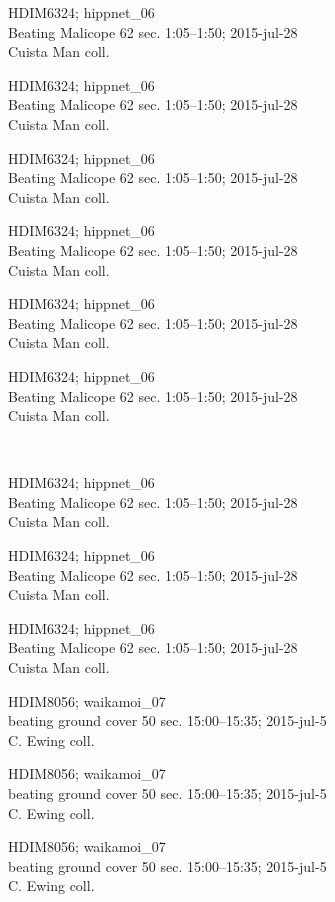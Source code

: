 \documentclass[2pt]{extarticle}
\begin{document}
\noindent
\parbox{0.16\textwidth}{\tiny \raggedright \rule[-0.3\baselineskip]{0pt}{10pt}HDIM6324; hippnet\_06\\ Beating Malicope 62 sec. 1:05--1:50; 2015-jul-28\\ Cuista Man coll.}
\parbox{0.16\textwidth}{\tiny \raggedright \rule[-0.3\baselineskip]{0pt}{10pt}HDIM6324; hippnet\_06\\ Beating Malicope 62 sec. 1:05--1:50; 2015-jul-28\\ Cuista Man coll.}
\parbox{0.16\textwidth}{\tiny \raggedright \rule[-0.3\baselineskip]{0pt}{10pt}HDIM6324; hippnet\_06\\ Beating Malicope 62 sec. 1:05--1:50; 2015-jul-28\\ Cuista Man coll.}
\parbox{0.16\textwidth}{\tiny \raggedright \rule[-0.3\baselineskip]{0pt}{10pt}HDIM6324; hippnet\_06\\ Beating Malicope 62 sec. 1:05--1:50; 2015-jul-28\\ Cuista Man coll.}
\parbox{0.16\textwidth}{\tiny \raggedright \rule[-0.3\baselineskip]{0pt}{10pt}HDIM6324; hippnet\_06\\ Beating Malicope 62 sec. 1:05--1:50; 2015-jul-28\\ Cuista Man coll.}
\parbox{0.16\textwidth}{\tiny \raggedright \rule[-0.3\baselineskip]{0pt}{10pt}HDIM6324; hippnet\_06\\ Beating Malicope 62 sec. 1:05--1:50; 2015-jul-28\\ Cuista Man coll.} \\ 
\vspace{0.001in} 

\noindent
\parbox{0.16\textwidth}{\tiny \raggedright \rule[-0.3\baselineskip]{0pt}{10pt}HDIM6324; hippnet\_06\\ Beating Malicope 62 sec. 1:05--1:50; 2015-jul-28\\ Cuista Man coll.}
\parbox{0.16\textwidth}{\tiny \raggedright \rule[-0.3\baselineskip]{0pt}{10pt}HDIM6324; hippnet\_06\\ Beating Malicope 62 sec. 1:05--1:50; 2015-jul-28\\ Cuista Man coll.}
\parbox{0.16\textwidth}{\tiny \raggedright \rule[-0.3\baselineskip]{0pt}{10pt}HDIM6324; hippnet\_06\\ Beating Malicope 62 sec. 1:05--1:50; 2015-jul-28\\ Cuista Man coll.}
\parbox{0.16\textwidth}{\tiny \raggedright \rule[-0.3\baselineskip]{0pt}{10pt}HDIM8056; waikamoi\_07\\ beating ground cover 50 sec. 15:00--15:35; 2015-jul-5\\ C. Ewing coll.}
\parbox{0.16\textwidth}{\tiny \raggedright \rule[-0.3\baselineskip]{0pt}{10pt}HDIM8056; waikamoi\_07\\ beating ground cover 50 sec. 15:00--15:35; 2015-jul-5\\ C. Ewing coll.}
\parbox{0.16\textwidth}{\tiny \raggedright \rule[-0.3\baselineskip]{0pt}{10pt}HDIM8056; waikamoi\_07\\ beating ground cover 50 sec. 15:00--15:35; 2015-jul-5\\ C. Ewing coll.} \\ 
\vspace{0.001in} 
\end{document}
